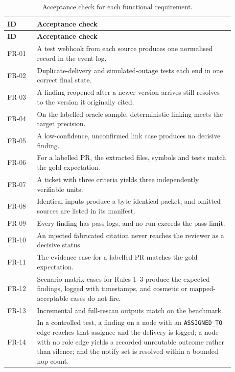 \begin{longtable}{>{\raggedright\arraybackslash}p{0.12\linewidth} >{\raggedright\arraybackslash}p{0.8\linewidth}}
\caption{Acceptance check for each functional requirement.}\label{tab:acceptance}\\
\hline
\textbf{ID} & \textbf{Acceptance check} \\
\hline
\endfirsthead
\hline
\textbf{ID} & \textbf{Acceptance check} \\
\hline
\endhead
FR-01 & A test webhook from each source produces one normalised record in the
        event log. \\
FR-02 & Duplicate-delivery and simulated-outage tests each end in one correct
        final state. \\
FR-03 & A finding reopened after a newer version arrives still resolves to the
        version it originally cited. \\
FR-04 & On the labelled oracle sample, deterministic linking meets the target
        precision. \\
FR-05 & A low-confidence, unconfirmed link case produces no decisive finding. \\
FR-06 & For a labelled PR, the extracted files, symbols and tests match the gold
        expectation. \\
FR-07 & A ticket with three criteria yields three independently verifiable
        units. \\
FR-08 & Identical inputs produce a byte-identical packet, and omitted sources are
        listed in its manifest. \\
FR-09 & Every finding has pass logs, and no run exceeds the pass limit. \\
FR-10 & An injected fabricated citation never reaches the reviewer as a decisive
        status. \\
FR-11 & The evidence case for a labelled PR matches the gold expectation. \\
FR-12 & Scenario-matrix cases for Rules 1--3 produce the expected findings,
        logged with timestamps, and cosmetic or mapped-acceptable cases do not
        fire. \\
FR-13 & Incremental and full-rescan outputs match on the benchmark. \\
FR-14 & In a controlled test, a finding on a node with an \texttt{ASSIGNED\_TO}
        edge reaches that assignee and the delivery is logged; a node with no
        role edge yields a recorded unroutable outcome rather than silence; and
        the notify set is resolved within a bounded hop count. \\

\end{longtable}
